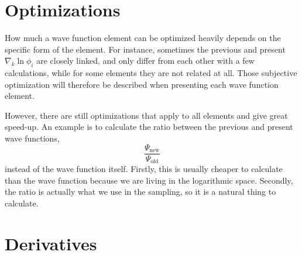 \section{Optimizations}
How much a wave function element can be optimized heavily depends on the specific form of the element. For instance, sometimes the previous and present $\nabla_k\ln\phi_i$ are closely linked, and only differ from each other with a few calculations, while for some elements they are not related at all. Those subjective optimization will therefore be described when presenting each wave function element. 

However, there are still optimizations that apply to all elements and give great speed-up. An example is to calculate the ratio between the previous and present wave functions,
\begin{equation*}
\frac{\Psi_{\text{new}}}{\Psi_{\text{old}}}
\end{equation*}
instead of the wave function itself. Firstly, this is usually cheaper to calculate than the wave function because we are living in the logarithmic space. Secondly, the ratio is actually what we use in the sampling, so it is a natural thing to calculate. 

\section{Derivatives}
